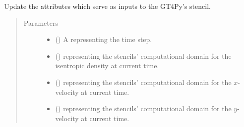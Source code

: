 \documentclass[letterpaper,10pt,english]{sphinxmanual}
\begin{document}
\begin{fulllineitems}
\begin{fulllineitems}
\end{fulllineitems}


\begin{fulllineitems}
\label{\detokenize{api:dycore.prognostic_isentropic_centered.PrognosticIsentropicCentered._set_stencils_stepping_by_neglecting_vertical_advection_inputs}}
Update the attributes which serve as inputs to the GT4Py’s stencil.
\begin{quote}\begin{description}
\item[{Parameters}] \leavevmode\begin{itemize}
\item {} 
 () \textendash{} A  representing the time step.

\item {} 
 () \textendash{}  representing the stencils’ computational domain for the isentropic density
at current time.

\item {} 
 () \textendash{}  representing the stencils’ computational domain for the \(x\)-velocity
at current time.

\item {} 
 () \textendash{}  representing the stencils’ computational domain for the \(y\)-velocity
at current time.


\end{itemize}
\end{description}
\end{quote}
\end{fulllineitems}
\end{fulllineitems}
\end{document}
